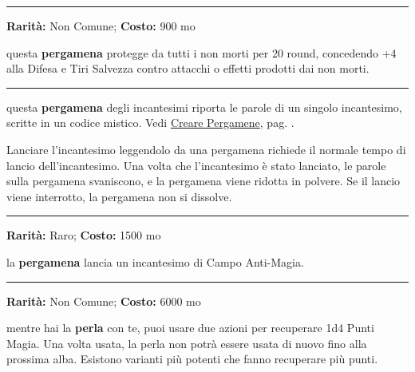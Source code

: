 \begin{multicols}{2}
\smallskip\noindent\rule{\linewidth}{2pt}  \hypertarget{Pergamenacontroinonmorti}{}\medskip{}\noindent\label{Pergamenacontroinonmorti}

\textbf{Rarità:} Non Comune; \textbf{Costo:} 900 mo

questa \textbf{pergamena} protegge da tutti i non morti per 20 round, concedendo +4 alla Difesa e Tiri Salvezza contro attacchi o effetti prodotti dai non morti.

\smallskip\noindent\rule{\linewidth}{2pt}  \hypertarget{PergamenadegliIncantesimi}{}\medskip{}\noindent\label{PergamenadegliIncantesimi}


questa \textbf{pergamena} degli incantesimi riporta le parole di un singolo incantesimo, scritte in un codice mistico. Vedi \hyperlink{crearepergamene}{Creare Pergamene}, pag. \pageref{crearepergamene}.

Lanciare l'incantesimo leggendolo da una pergamena richiede il normale tempo di lancio dell'incantesimo. Una volta che l'incantesimo è stato lanciato, le parole sulla pergamena svaniscono, e la pergamena viene ridotta in polvere. Se il lancio viene interrotto, la pergamena non si dissolve.

\smallskip\noindent\rule{\linewidth}{2pt}  \hypertarget{Pergamenaprotettivacontrolamagia}{}\medskip{}\noindent\label{Pergamenaprotettivacontrolamagia}

\textbf{Rarità:} Raro; \textbf{Costo:} 1500 mo

la \textbf{pergamena} lancia un incantesimo di Campo Anti-Magia.

\smallskip\noindent\rule{\linewidth}{2pt}  \hypertarget{PerladelPotere}{}\medskip{}\noindent\label{PerladelPotere}

\textbf{Rarità:} Non Comune; \textbf{Costo:} 6000 mo

mentre hai la \textbf{perla} con te, puoi usare due azioni per recuperare 1d4 Punti Magia. Una volta usata, la perla non potrà essere usata di nuovo fino alla prossima alba. Esistono varianti più potenti che fanno recuperare più punti.


\end{multicols}

